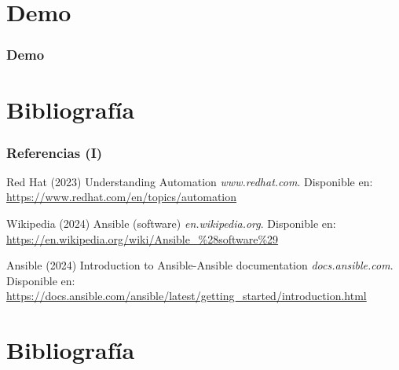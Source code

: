 \documentclass[
	11pt, %
]{beamer}
\begin{document}

\section{Demo}

\begin{frame}
	\frametitle{Demo}
	
\end{frame}


\section{Bibliografía}

\begin{frame} %
	\frametitle{Referencias (I)}
	
	\begin{thebibliography}{99} %
		\footnotesize %
		
                Red Hat (2023)
                \newblock Understanding Automation
                \newblock \emph{www.redhat.com}. Disponible en: \url{https://www.redhat.com/en/topics/automation}
   
                Wikipedia (2024)
                \newblock Ansible (software)
                \newblock \emph{en.wikipedia.org}. Disponible en: \url{https://en.wikipedia.org/wiki/Ansible\_\%28software\%29}
            
                Ansible (2024)
                \newblock Introduction to Ansible-Ansible documentation
                \newblock \emph{docs.ansible.com}. Disponible en: \url{https://docs.ansible.com/ansible/latest/getting_started/introduction.html}

	\end{thebibliography}
\end{frame}


\section{Bibliografía}
\end{document}
